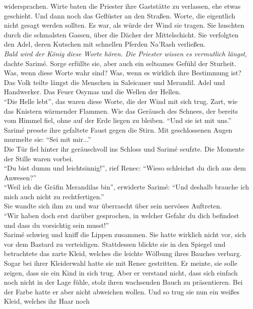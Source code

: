widersprachen. Wirte baten die Priester ihre Gaststätte zu verlassen, ehe etwas geschieht. Und dann 
noch das Geflüster an den Straßen. Worte, die eigentlich nicht gesagt werden sollten. Es war, als 
würde der Wind sie tragen. Sie huschten durch die schmalsten Gassen, über die Dächer der 
Mittelschicht. Sie verfolgten den Adel, deren Kutschen mit schnellen Pferden Na'Rash verließen.\\
\textit{Bald wird der König diese Worte hören. Die Priester wissen es vermutlich längst}, dachte 
Sarimé. Sorge erfüllte sie, aber auch ein seltsames Gefühl der Sturheit. Was, wenn diese Worte wahr 
sind? Was, wenn es wirklich ihre Bestimmung ist?\\
Das Volk teilte längst die Menschen in Saleicaner und Merandil. Adel und Handwerker. Das Feuer 
Osymas und die Wellen der Hellen.\\
``Die Helle lebt'', das waren diese Worte, die der Wind mit sich trug. Zart, wie das Knistern 
wärmender Flammen. Wie das Geräusch des Schnees, der bereits vom Himmel fiel, ohne auf der 
Erde liegen zu bleiben. ``Und sie ist mit uns.''\\
Sarimé presste ihre gefaltete Faust gegen die Stirn. Mit geschlossenen Augen murmelte sie: ``Sei 
mit mir...''\\
Die Tür fiel hinter ihr geräuschvoll ins Schloss und Sarimé seufzte. Die Momente der Stille waren 
vorbei.\\
``Du bist dumm und leichtsinnig!'', rief Renec: ``Wieso schleichst du dich aus dem Anwesen?''\\
``Weil ich die Gräfin Merandilas bin'', erwiderte Sarimé: ``Und deshalb brauche ich mich auch nicht 
zu rechtfertigen.''\\
Sie wandte sich ihm zu und war überrascht über sein nervöses Auftreten.\\
``Wir haben doch erst darüber gesprochen, in welcher Gefahr du dich befindest und dass du 
vorsichtig sein musst!''\\
Sarimé schwieg und kniff die Lippen zusammen. Sie hatte wirklich nicht vor, sich vor dem Bastard zu 
verteidigen. Stattdessen blickte sie in den Spiegel und betrachtete das zarte Kleid, welches die 
leichte Wölbung ihres Bauches verbarg. Sogar bei ihrer Kleiderwahl hatte sie mit Renec gestritten. 
Er meinte, sie solle zeigen, dass sie ein Kind in sich trug. Aber er verstand nicht, dass sich 
einfach noch nicht in der Lage fühle, stolz ihren wachsenden Bauch zu präsentieren. Bei der Farbe 
hatte er aber nicht abweichen wollen. Und so trug sie nun ein weißes Kleid, welches ihr Haar noch 
